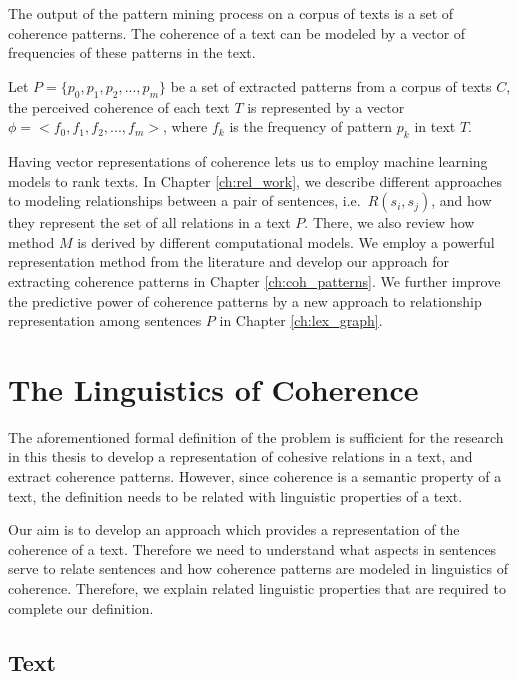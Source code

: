 The output of the pattern mining process on a corpus of texts is a set of coherence patterns. 
The coherence of a text can be modeled by a vector of frequencies of these patterns in the text. 

\begin{definition}
Let $P=\lbrace p_0,p_1,p_2,...,p_m \rbrace$ be a set of extracted patterns from a corpus of texts $C$, the perceived coherence of each text $T$ is represented by a vector $\phi = <f_0, f_1, f_2,...,f_m>$, where $f_k$ is the frequency of pattern $p_k$ in text $T$. 
\end{definition}

Having vector representations of coherence lets us to employ machine learning models to rank texts. 
In Chapter \ref{ch:rel_work}, we describe different approaches to modeling relationships between a pair of sentences, i.e.\ $R(s_i,s_j)$, and how they represent the set of all relations in a text $P$.  
There, we also review how method $M$ is derived by different computational models. 
We employ a powerful representation method from the literature and develop our approach for extracting coherence patterns in Chapter \ref{ch:coh_patterns}. 
We further improve the predictive power of coherence patterns by a new approach to relationship representation among sentences $P$ in Chapter \ref{ch:lex_graph}. 

\section{The Linguistics of Coherence}

The aforementioned formal definition of the problem is sufficient for the research in this thesis to develop a representation of cohesive relations in a text, and extract coherence patterns. 
However, since coherence is a semantic property of a text, the definition needs to be related with linguistic properties of a text. 

Our aim is to develop an approach which provides a representation of the coherence of a text. 
Therefore we need to understand what aspects in sentences serve to relate sentences and how coherence patterns are modeled in linguistics of coherence. 
Therefore, we explain related linguistic properties that are required to complete our definition. 


\subsection{Text}

